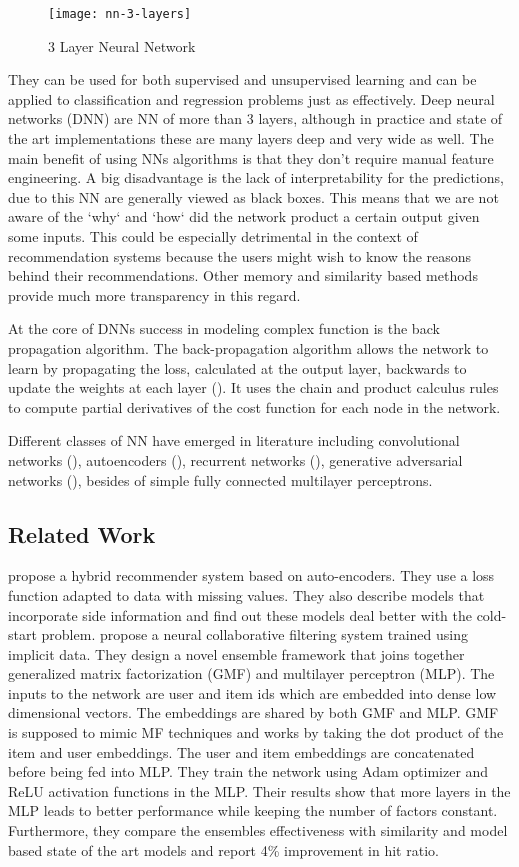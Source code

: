\begin{figure}[h!]
    \texttt{[image: nn-3-layers]}
    \caption{3 Layer Neural Network}
\end{figure}

They can be used for both supervised and unsupervised learning and can be applied to classification and regression problems just as effectively. Deep neural networks (DNN) are NN of more than 3 layers, although in practice and state of the art implementations these are many layers deep and very wide as well. The main benefit of using NNs algorithms is that they don't require manual feature engineering.
A big disadvantage is the lack of interpretability for the predictions, due to this NN are generally viewed as black boxes. This means that we are not aware of the `why` and `how` did the network product a certain output given some inputs. This could be especially detrimental in the context of recommendation systems because the users might wish to know the reasons behind their recommendations. Other memory and similarity based methods provide much more transparency in this regard.

At the core of DNNs success in modeling complex function is the back propagation algorithm. The back-propagation algorithm allows the network to learn by propagating the loss, calculated at the output layer, backwards to update the weights at each layer (\citet{backpropagation}). It uses the chain and product calculus rules to compute partial derivatives of the cost function for each node in the network. 

Different classes of NN have emerged in literature including convolutional networks (\citet{cnn}), autoencoders (\citet{autoencoders}), recurrent networks (\citet{rnn}), generative adversarial networks (\citet{gan}), besides of simple fully connected multilayer perceptrons.

\subsection{Related Work}
\citet{HybridAutoencoders} propose a hybrid recommender system based on auto-encoders. They use a loss function adapted to data with missing values. They also describe models that incorporate side information and find out these models deal better with the cold-start problem.
\citet{NeuralCF} propose a neural collaborative filtering system trained using implicit data. They design a novel ensemble framework that joins together generalized matrix factorization (GMF) and multilayer perceptron (MLP). The inputs to the network are user and item ids which are embedded into dense low dimensional vectors. The embeddings are shared by both GMF and MLP. GMF is supposed to mimic MF techniques and works by taking the dot product of the item and user embeddings. The user and item embeddings are concatenated before being fed into MLP. 
They train the network using Adam optimizer and ReLU activation functions in the MLP. Their results show that more layers in the MLP leads to better performance while keeping the number of factors constant. Furthermore, they compare the ensembles effectiveness with similarity and model based state of the art models and report 4\% improvement in hit ratio.
